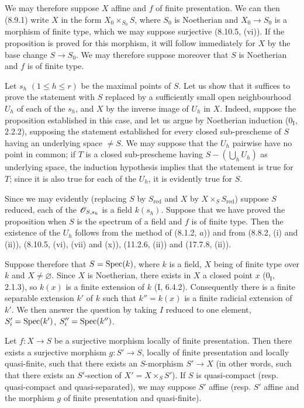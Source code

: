 We may therefore suppose $X$ affine and $f$ of finite presentation. We can then (8.9.1) write $X$ in the form $X_0\times_{S_0}S$, where $S_0$ is Noetherian and $X_0\to S_0$ is a morphism of finite type, which we may suppose surjective (8.10.5, (vi)). If the proposition is proved for this morphism, it will follow immediately for $X$ by the base change $S\to S_0$. We may therefore suppose moreover that $S$ is Noetherian and $f$ is of finite type.

Let $s_h$ $(1\leq h\leq r)$ be the maximal points of $S$. Let us show that it suffices to prove the statement with $S$ replaced by a sufficiently small open neighbourhood $U_h$ of each of the $s_h$, and $X$ by the inverse image of $U_h$ in $X$. Indeed, suppose the proposition established in this case, and let us argue by Noetherian induction ($0_{\mathrm I}$, 2.2.2), supposing the statement established for every closed sub-prescheme of $S$ having an underlying space $\neq S$. We may suppose that the $U_h$ pairwise have no point in common; if $T$ is a closed sub-prescheme having $S-(\bigcup_h U_h)$ as underlying space, the induction hypothesis implies that the statement is true for $T$; since it is also true for each of the $U_h$, it is evidently true for $S$.

Since we may evidently (replacing $S$ by $S_{\mathrm{red}}$ and $X$ by $X\times_S S_{\mathrm{red}}$) suppose $S$ reduced, each of the $\mathscr{O}_{S,s_h}$ is a field $k(s_h)$. Suppose that we have proved the proposition when $S$ is the spectrum of a field and $f$ is of finite type. Then the existence of the $U_h$ follows from the method of (8.1.2, $a$)) and from (8.8.2, (i) and (ii)), (8.10.5, (vi), (vii) and (x)), (11.2.6, (ii)) and (17.7.8, (ii)).

Suppose therefore that $S=\operatorname{Spec}(k)$, where $k$ is a field, $X$ being of finite type over $k$ and $X\neq\varnothing$. Since $X$ is Noetherian, there exists in $X$ a closed point $x$ ($0_{\mathrm I}$, 2.1.3), so $k(x)$ is a finite extension of $k$ (I, 6.4.2). Consequently there is a finite separable extension $k'$ of $k$ such that $k''=k(x)$ is a finite radicial extension of $k'$. We then answer the question by taking $I$ reduced to one element, $S_i'=\operatorname{Spec}(k')$, $S_i''=\operatorname{Spec}(k'')$.


\begin{corollary}[17.16.5]
\label{IV.17.16.5}
Let $f:X\to S$ be a surjective morphism locally of finite presentation. Then there exists a surjective morphism $g:S'\to S$, locally of finite presentation and locally quasi-finite, such that there exists an $S$-morphism $S'\to X$ (in other words, such that there exists an $S'$-section of $X'=X\times_S S'$). If $S$ is quasi-compact (resp. quasi-compact and quasi-separated), we may suppose $S'$ affine (resp. $S'$ affine and the morphism $g$ of finite presentation and quasi-finite).
\end{corollary}

